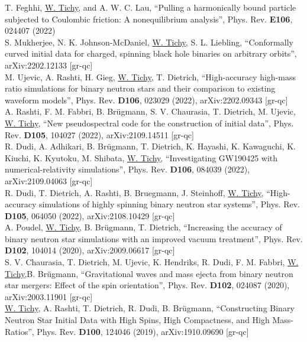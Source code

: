 T. Feghhi, \underline{W. Tichy}, and A. W. C. Lau,
``Pulling a harmonically bound particle subjected to Coulombic friction:
A nonequilibrium analysis'',
Phys. Rev. {\bf E106}, 024407 (2022)
\\

S. Mukherjee, N. K. Johnson-McDaniel, \underline{W. Tichy}, S. L. Liebling,
``Conformally curved initial data for charged, spinning black hole
binaries on arbitrary orbits'',
arXiv:2202.12133 [gr-qc]
\\

M. Ujevic, A. Rashti, H. Gieg, \underline{W. Tichy}, T. Dietrich,
``High-accuracy high-mass ratio simulations for binary neutron stars and
their comparison to existing waveform models'',
Phys. Rev. {\bf D106}, 023029 (2022),
arXiv:2202.09343 [gr-qc]
\\

A. Rashti, F. M. Fabbri, B. Brügmann, S. V. Chaurasia, T. Dietrich, M. Ujevic,
\underline{W. Tichy},
``New pseudospectral code for the construction of initial data'',
Phys. Rev. {\bf D105}, 104027 (2022),
arXiv:2109.14511 [gr-qc]
\\

R. Dudi, A. Adhikari, B. Brügmann, T. Dietrich, K. Hayashi, K. Kawaguchi,
K. Kiuchi, K. Kyutoku, M. Shibata, \underline{W. Tichy},
``Investigating GW190425 with numerical-relativity simulations'',
Phys. Rev. {\bf D106}, 084039 (2022),
arXiv:2109.04063  [gr-qc]
\\

R. Dudi, T. Dietrich, A. Rashti, B. Bruegmann, J. Steinhoff,
\underline{W. Tichy},
``High-accuracy simulations of highly spinning binary neutron star
systems'',
Phys. Rev. {\bf D105}, 064050 (2022),
arXiv:2108.10429  [gr-qc]
\\

A. Poudel, \underline{W. Tichy}, B. Brügmann, T. Dietrich,
``Increasing the accuracy of binary neutron star simulations with an
improved vacuum treatment'',
Phys. Rev. {\bf D102}, 104014 (2020),
arXiv:2009.06617 [gr-qc]
\\

S. V. Chaurasia, T. Dietrich, M. Ujevic, K. Hendriks, R. Dudi, F. M. Fabbri,
\underline{W. Tichy},B. Br\"ugmann,
``Gravitational waves and mass ejecta from binary neutron star mergers:
Effect of the spin orientation'',
Phys. Rev. {\bf D102}, 024087 (2020),
arXiv:2003.11901 [gr-qc]
\\

\underline{W. Tichy}, A. Rashti, T. Dietrich, R. Dudi, B. Br\"ugmann,
``Constructing Binary Neutron Star Initial Data with High Spins,
High Compactness, and High Mass-Ratios'',
Phys. Rev. {\bf D100}, 124046 (2019),
arXiv:1910.09690 [gr-qc]
\\

